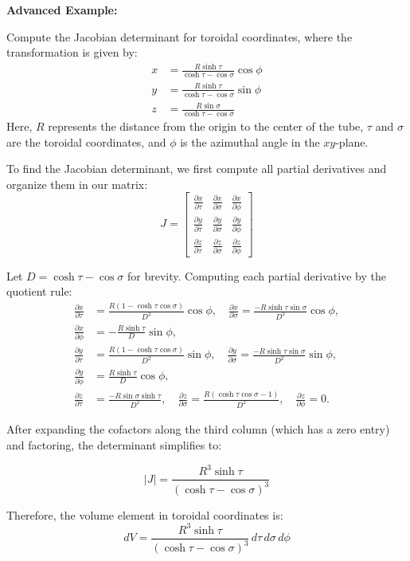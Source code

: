 \exampleline {}
\noindent \textbf{Advanced Example:}
\begin{example}
Compute the Jacobian determinant for toroidal coordinates, where the transformation is given by:
\begin{align*}
x &= \frac{R \sinh \tau}{\cosh \tau - \cos \sigma} \cos \phi \\
y &= \frac{R \sinh \tau}{\cosh \tau - \cos \sigma} \sin \phi \\
z &= \frac{R \sin \sigma}{\cosh \tau - \cos \sigma}
\end{align*}
Here, \(R\) represents the distance from the origin to the center of the tube, \(\tau\) and \(\sigma\) are the toroidal coordinates, and \(\phi\) is the azimuthal angle in the \(xy\)-plane.



\begin{solution}
To find the Jacobian determinant, we first compute all partial derivatives and organize them in our matrix:
\[
J = \begin{bmatrix}
\frac{\partial x}{\partial \tau} & \frac{\partial x}{\partial \sigma} & \frac{\partial x}{\partial \phi} \\[1ex]
\frac{\partial y}{\partial \tau} & \frac{\partial y}{\partial \sigma} & \frac{\partial y}{\partial \phi} \\[1ex]
\frac{\partial z}{\partial \tau} & \frac{\partial z}{\partial \sigma} & \frac{\partial z}{\partial \phi}
\end{bmatrix}
\]

\noindent Let \( D = \cosh\tau - \cos\sigma \) for brevity. Computing each partial derivative by the quotient rule:
\begin{align*}
\frac{\partial x}{\partial \tau} &= \frac{R(1 - \cosh\tau\cos\sigma)}{D^2}\cos\phi, \quad
\frac{\partial x}{\partial \sigma} = \frac{-R\sinh\tau\sin\sigma}{D^2}\cos\phi, \\
\frac{\partial x}{\partial \phi} &= -\frac{R\sinh\tau}{D}\sin\phi, \\[1ex]
\frac{\partial y}{\partial \tau} &= \frac{R(1 - \cosh\tau\cos\sigma)}{D^2}\sin\phi, \quad
\frac{\partial y}{\partial \sigma} = \frac{-R\sinh\tau\sin\sigma}{D^2}\sin\phi, \\
\frac{\partial y}{\partial \phi} &= \frac{R\sinh\tau}{D}\cos\phi, \\[1ex]
\frac{\partial z}{\partial \tau} &= \frac{-R\sin\sigma\sinh\tau}{D^2}, \quad
\frac{\partial z}{\partial \sigma} = \frac{R(\cosh\tau\cos\sigma - 1)}{D^2}, \quad
\frac{\partial z}{\partial \phi} = 0.
\end{align*}

\noindent After expanding the cofactors along the third column (which has a zero entry) and factoring, the determinant simplifies to:

\[
|J| = \frac{R^3 \sinh \tau}{(\cosh \tau - \cos \sigma)^3}
\]

\noindent Therefore, the volume element in toroidal coordinates is:
\[
dV = \frac{R^3 \sinh \tau}{(\cosh \tau - \cos \sigma)^3} \, d\tau \, d\sigma \, d\phi
\]
\end{solution}
\end{example}
\exampleline


